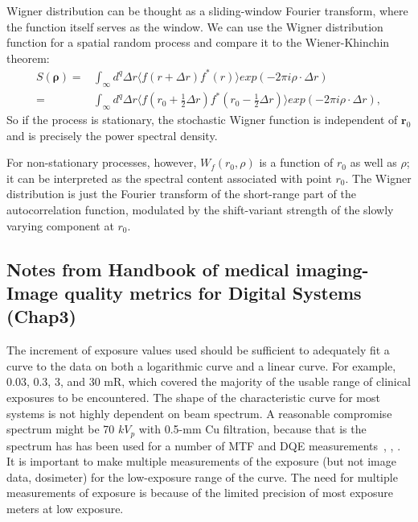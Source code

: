 \noindent Wigner distribution can be thought as a sliding-window Fourier transform, where the function itself serves as the window.
We can use the Wigner distribution function for a spatial random process and compare it to the Wiener-Khinchin theorem:
\begin{equation}
\begin{split}
S(\mathbf{\rho}) =& \int_{\infty} d^q \Delta r \langle f(r + \Delta r) f^*(r) \rangle exp(-2 \pi i \rho \cdot \Delta r) \\
= & \int_{\infty} d^q \Delta r \langle f(r_0 + \frac{1}{2} \Delta r) f^*(r_0 - \frac{1}{2} \Delta r) \rangle exp(-2\pi i \rho \cdot \Delta r), 
\end{split}
\end{equation}
So if the process is stationary, the stochastic Wigner function is independent of $\mathbf{r}_0$ and is precisely the power spectral density.

For non-stationary processes, however, $W_f(r_0, \rho)$ is a function of $r_0$ as well as $\rho$; it can be interpreted as the spectral content associated with point $r_0$.  
The Wigner distribution is just the Fourier transform of the short-range part of the autocorrelation function, modulated by the shift-variant strength of the slowly varying component at $r_0$.

\subsection{Notes from Handbook of medical imaging-Image quality metrics for Digital Systems (Chap3)}
The increment of exposure values used should be sufficient to adequately fit a curve to the data on both a logarithmic curve and a linear curve. For example, 0.03, 0.3, 3, and 30 mR, which covered the majority of the usable range of clinical exposures to be encountered.  The shape of the characteristic curve for most systems is not highly dependent on beam spectrum.  A reasonable compromise spectrum might be 70 $kV_p$ with 0.5-mm Cu filtration, because that is the spectrum has has been used for a number of MTF and DQE measurements~\citep{Dobbins1995}, \citep{Bradford1999}, \citep{Hillen1987}. 
It is important to make multiple measurements of the exposure (but not image data, dosimeter) for the low-exposure range of the curve.  The need for multiple measurements of exposure is because of the limited precision of most exposure meters at low exposure.

